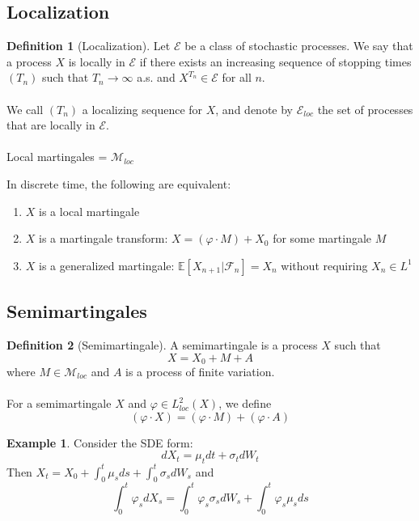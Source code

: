 \documentclass[11pt,a4paper]{article}
\theoremstyle{definition}
\newtheorem{definition}{Definition}[section]
\newtheorem{example}{Example}[section]
\begin{document}
\subsection{Localization}

\begin{definition}[Localization]\label{def:localization}
Let $\mathcal{E}$ be a class of stochastic processes. We say that a process $X$ is locally in $\mathcal{E}$ if there exists an increasing sequence of stopping times $(T_n)$ such that $T_n \to \infty$ a.s. and $X^{T_n} \in \mathcal{E}$ for all $n$.
~\\~\\
We call $(T_n)$ a localizing sequence for $X$, and denote by $\mathcal{E}_{loc}$ the set of processes that are locally in $\mathcal{E}$.
~\\~\\
Local martingales = $\mathcal{M}_{loc}$
\end{definition}
\noindent In discrete time, the following are equivalent:
\begin{enumerate}
    \item $X$ is a local martingale
    \item $X$ is a martingale transform: $X = (\varphi \cdot M) + X_0$ for some martingale $M$
    \item $X$ is a generalized martingale: $\mathbb{E}[X_{n+1}|\mathcal{F}_n] = X_n$ without requiring $X_n \in L^1$
\end{enumerate}

\subsection{Semimartingales}

\begin{definition}[Semimartingale]\label{def:semimartingale}
A semimartingale is a process $X$ such that
\[
X = X_0 + M + A
\]
where $M \in \mathcal{M}_{loc}$ and $A$ is a process of finite variation.
~\\~\\
For a semimartingale $X$ and $\varphi \in L^2_{loc}(X)$, we define
\[
(\varphi \cdot X) = (\varphi \cdot M) + (\varphi \cdot A)
\]
\end{definition}

\begin{example}\label{ex:sde_form}
Consider the SDE form:
\[
dX_t = \mu_t dt + \sigma_t dW_t
\]
Then $X_t = X_0 + \int_0^t \mu_s ds + \int_0^t \sigma_s dW_s$ and
\[
\int_0^t \varphi_s dX_s = \int_0^t \varphi_s \sigma_s dW_s + \int_0^t \varphi_s \mu_s ds
\]
\end{example}
\end{document}
